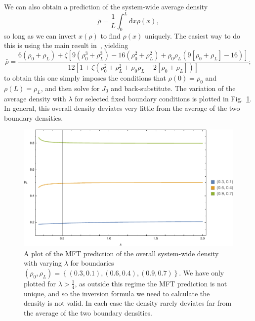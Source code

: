 We can also obtain a prediction of the system-wide average density
\begin{equation}
 \bar{\rho} = \frac{1}{L} \int_0^L  \! \! \mathrm{d}x \rho(x),
\end{equation}
so long as we can invert $x(\rho)$ to find $\rho(x)$ uniquely. The easiest way to do this is using the main result in~\cite{laisant1905}, yielding
\begin{equation}
 \bar{\rho} = \frac{6 (\rho_0 + \rho_L) + \zeta \left[9 \left( \rho_0^3 + \rho_L^3\right) - 16 \left( \rho_0^2 + \rho_L^2 \right) + \rho_0\rho_L\left( 9\left[ \rho_0 + \rho_L \right] - 16  \right)  \right]}{12 \left[ 1 + 
  \zeta \left( \rho_0^2 + \rho_L^2 + \rho_0 \rho_L - 2 \left[ \rho_0+\rho_L \right] \right) \right]};
\end{equation}
to obtain this one simply imposes the conditions that $\rho(0)=\rho_0$ and $\rho(L)=\rho_L$, and then solve for $J_0$
and back-substitute.
The variation of the average density with $\lambda$ for selected fixed boundary conditions is plotted in Fig.~\ref{fig:mftDens}. In general, this overall density deviates very little from the average of the two boundary densities.
\begin{figure}[h!]
 \caption[The variation of the system-wide average density with respect to $\lambda$ in the MFT, with fixed boundary densities.]{\label{fig:mftDens} 
 A plot of the MFT prediction of the overall system-wide density with varying $\lambda$ for boundaries $(\rho_0, \rho_L) = \left\lbrace (0.3, 0.1), (0.6, 0.4), (0.9, 0.7) \right\rbrace$.
 We have only plotted for $\lambda>\frac{1}{4}$, as outside this regime the MFT prediction is not unique, and so the inversion formula we need to calculate the density is not valid. In each case the density rarely deviates far from
 the average of the two boundary densities.}
 \includegraphics[width=0.99\linewidth]{analytics/images/mftDensity1d}
\end{figure}

